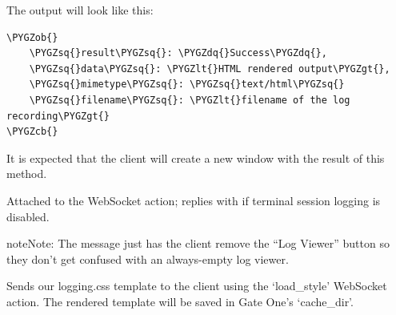 \documentclass[letterpaper,10pt,openany]{sphinxmanual}
\def\PYGZob{\char`\{}
\def\PYGZcb{\char`\}}
\def\PYGZlt{\char`\<}
\def\PYGZgt{\char`\>}
\def\PYGZsq{\char`\'}
\def\PYGZdq{\char`\"}
\begin{document}
\begin{fulllineitems}
\begin{quote}
\begin{description}
\begin{itemize}
\end{itemize}

\end{description}\end{quote}

The output will look like this:

\begin{Verbatim}[commandchars=\\\{\}]
\PYGZob{}
    \PYGZsq{}result\PYGZsq{}: \PYGZdq{}Success\PYGZdq{},
    \PYGZsq{}data\PYGZsq{}: \PYGZlt{}HTML rendered output\PYGZgt{},
    \PYGZsq{}mimetype\PYGZsq{}: \PYGZsq{}text/html\PYGZsq{}
    \PYGZsq{}filename\PYGZsq{}: \PYGZlt{}filename of the log recording\PYGZgt{}
\PYGZcb{}
\end{Verbatim}

It is expected that the client will create a new window with the result of
this method.

\end{fulllineitems}


\begin{fulllineitems}
\label{Applications/terminal/plugin_logging:logging_plugin.session_logging_check}
Attached to the  WebSocket action; replies
with  if terminal session logging is
disabled.

\begin{notice}{note}{Note:}
The  message just has the client
remove the ``Log Viewer'' button so they don't get confused with an
always-empty log viewer.
\end{notice}

\end{fulllineitems}


\begin{fulllineitems}
\label{Applications/terminal/plugin_logging:logging_plugin.send_logging_css_template}
Sends our logging.css template to the client using the `load\_style'
WebSocket action.  The rendered template will be saved in Gate One's
`cache\_dir'.

\end{fulllineitems}
\end{document}
